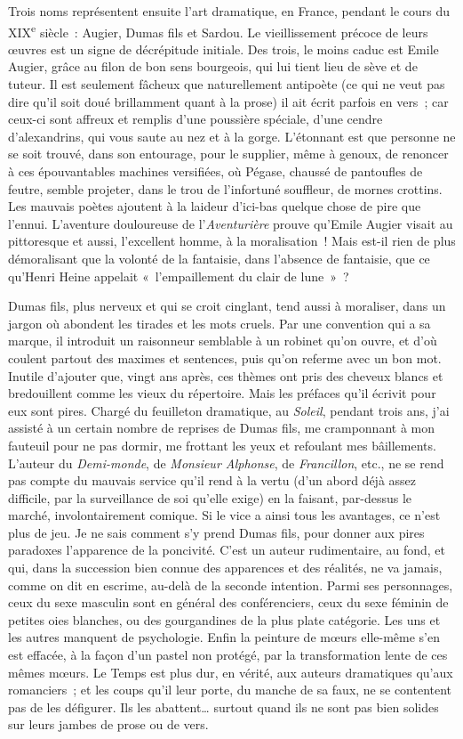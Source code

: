 \documentclass[french,twoside]{book} %
\begin{document}
Trois noms représentent ensuite l’art dramatique, en France, pendant le cours du XIX\textsuperscript{e} siècle : Augier, Dumas fils et Sardou. Le vieillissement précoce de leurs œuvres est un signe de décrépitude initiale. Des trois, le moins caduc est Emile Augier, grâce au filon de bon sens bourgeois, qui lui tient lieu de sève et de tuteur. Il est seulement fâcheux que naturellement antipoète (ce qui ne veut pas dire qu’il soit doué brillamment quant à la prose) il ait écrit parfois en vers ; car ceux-ci sont affreux et remplis d’une poussière spéciale, d’une cendre d’alexandrins, qui vous saute au nez et à la gorge. L’étonnant est que personne ne se soit trouvé, dans son entourage, pour le supplier, même à genoux, de renoncer à ces épouvantables machines versifiées, où Pégase, chaussé de pantoufles de feutre, semble projeter, dans le trou de l’infortuné souffleur, de mornes crottins. Les mauvais poètes ajoutent à la laideur d’ici-bas quelque chose de pire que l’ennui. L’aventure douloureuse de l’{\itshape Aventurière} prouve qu’Emile Augier visait au pittoresque et aussi, l’excellent homme, à la moralisation ! Mais est-il rien de plus démoralisant que la volonté de la fantaisie, dans l’absence de fantaisie, que ce qu’Henri Heine appelait « l’empaillement du clair de lune » ?\par
Dumas fils, plus nerveux et qui se croit cinglant, tend aussi à moraliser, dans un jargon où abondent les tirades et les mots cruels. Par une convention qui a sa marque, il introduit un raisonneur semblable à un robinet qu’on ouvre, et d’où coulent partout des maximes et sentences, puis qu’on referme avec un bon mot. Inutile d’ajouter que, vingt ans après, ces thèmes ont pris des cheveux blancs et bredouillent comme les vieux du répertoire. Mais les préfaces qu’il écrivit pour eux sont pires. Chargé du feuilleton dramatique, au {\itshape Soleil}, pendant trois ans, j’ai assisté à un certain nombre de reprises de Dumas fils, me cramponnant à mon fauteuil pour ne pas dormir, me frottant les yeux et refoulant mes bâillements. L’auteur du {\itshape Demi-monde}, de {\itshape Monsieur Alphonse}, de {\itshape Francillon}, etc., ne se rend pas compte du mauvais service qu’il rend à la vertu (d’un abord déjà assez difficile, par la surveillance de soi qu’elle exige) en la faisant, par-dessus le marché, involontairement comique. Si le vice a ainsi tous les avantages, ce n’est plus de jeu. Je ne sais comment s’y prend Dumas fils, pour donner aux pires paradoxes l’apparence de la poncivité. C’est un auteur rudimentaire, au fond, et qui, dans la succession bien connue des apparences et des réalités, ne va jamais, comme on dit en escrime, au-delà de la seconde intention. Parmi ses personnages, ceux du sexe masculin sont en général des conférenciers, ceux du sexe féminin de petites oies blanches, ou des gourgandines de la plus plate catégorie. Les uns et les autres manquent de psychologie. Enfin la peinture de mœurs elle-même s’en est effacée, à la façon d’un pastel non protégé, par la transformation lente de ces mêmes mœurs. Le Temps est plus dur, en vérité, aux auteurs dramatiques qu’aux romanciers ; et les coups qu’il leur porte, du manche de sa faux, ne se contentent pas de les défigurer. Ils les abattent… surtout quand ils ne sont pas bien solides sur leurs jambes de prose ou de vers.\par
\end{document}
